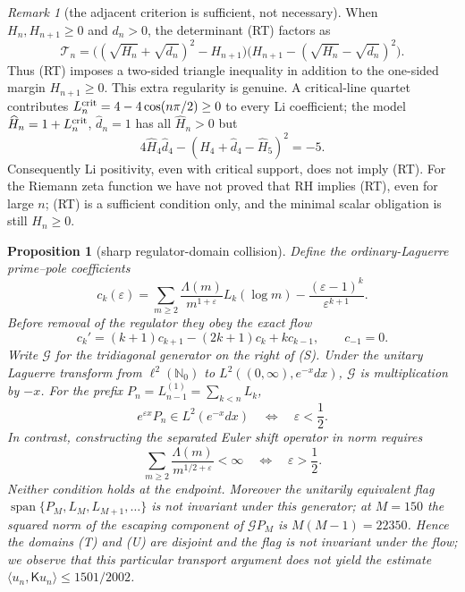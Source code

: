 \documentclass[11pt]{amsart}
\newtheorem{proposition}[theorem]{Proposition}
\theoremstyle{definition}
\theoremstyle{remark}
\newtheorem{remark}[theorem]{Remark}
\theoremstyle{definition}
\begin{document}
\begin{remark}[the adjacent criterion is sufficient, not necessary]
\label{rmk:a1-adjacent-triangle}
When $H_n,H_{n+1}\ge0$ and $d_n>0$, the determinant (RT) factors as
\[
 \mathcal T_n=
 \bigl((\sqrt{H_n}+\sqrt{d_n})^2-H_{n+1}\bigr)
 \bigl(H_{n+1}-(\sqrt{H_n}-\sqrt{d_n})^2\bigr).
\]
Thus (RT) imposes a two-sided triangle inequality in addition to the
one-sided margin $H_{n+1}\ge0$.  This extra regularity is genuine.  A
critical-line quartet contributes
$L_n^{\rm crit}=4-4\cos(n\pi/2)\ge0$ to every Li coefficient; the model
$\widehat H_n=1+L_n^{\rm crit}$, $\widehat d_n=1$ has all
$\widehat H_n>0$ but
\[
 4\widehat H_4\widehat d_4-
 (\widehat H_4+\widehat d_4-\widehat H_5)^2=-5.
\]
Consequently Li positivity, even with critical support, does not imply
(RT).  For the Riemann zeta function we have not proved that RH implies
(RT), even for large $n$; (RT) is a sufficient condition only, and the
minimal scalar obligation is still $H_n\ge0$.
\end{remark}

\begin{proposition}[sharp regulator-domain collision]
\label{prop:a1-epsilon-flow}
Define the ordinary-Laguerre prime--pole coefficients
\[
 c_k(\varepsilon)=
 \sum_{m\ge2}\frac{\Lambda(m)}{m^{1+\varepsilon}}L_k(\log m)
 -\frac{(\varepsilon-1)^k}{\varepsilon^{k+1}}.
\]
Before removal of the regulator they obey the exact flow
\[
 c_k'=(k+1)c_{k+1}-(2k+1)c_k+kc_{k-1},\qquad c_{-1}=0.       \tag{S}
\]
Write $\mathcal G$ for the tridiagonal generator on the right of (S).
Under the unitary Laguerre transform from $\ell^2(\mathbb N_0)$ to
$L^2((0,\infty),e^{-x}dx)$, $\mathcal G$ is multiplication by
$-x$.  For the prefix $P_n=L_{n-1}^{(1)}=\sum_{k<n}L_k$,
\[
 e^{\varepsilon x}P_n\in L^2(e^{-x}dx)
 \quad\Longleftrightarrow\quad \varepsilon<\frac12.          \tag{T}
\]
In contrast, constructing the separated Euler shift operator in norm
requires
\[
 \sum_{m\ge2}\frac{\Lambda(m)}{m^{1/2+\varepsilon}}<\infty
 \quad\Longleftrightarrow\quad \varepsilon>\frac12.          \tag{U}
\]
Neither condition holds at the endpoint.  Moreover the unitarily equivalent
flag $\operatorname{span}\{P_M,L_M,L_{M+1},\ldots\}$ is not invariant under
this generator; at $M=150$ the squared norm of the escaping component of
$\mathcal G P_M$ is
$M(M-1)=22350$.  Hence the domains (T) and (U) are disjoint and the flag is not invariant under
the flow; we observe that this particular transport argument does not yield the estimate
$\langle u_n,\mathsf Ku_n\rangle\le1501/2002$.
\end{proposition}
\end{document}
